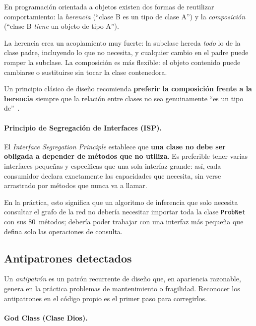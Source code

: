 \documentclass[11pt,a4paper]{article}
\newcommand{\code}[1]{\texttt{#1}}
\begin{document}
En programación orientada a objetos existen dos formas de reutilizar
comportamiento: la \emph{herencia} (``clase B es un tipo de clase A'')
y la \emph{composición} (``clase B \emph{tiene} un objeto de tipo A'').

La herencia crea un acoplamiento muy fuerte: la subclase hereda
\emph{todo} lo de la clase padre, incluyendo lo que no necesita, y
cualquier cambio en el padre puede romper la subclase.  La composición
es más flexible: el objeto contenido puede cambiarse o sustituirse sin
tocar la clase contenedora.

Un principio clásico de diseño recomienda \textbf{preferir la composición
frente a la herencia} siempre que la relación entre clases no sea
genuinamente ``es un tipo de''~\cite{gamma1995}.

\label{sec:fund-isp}
\paragraph{Principio de Segregación de Interfaces (ISP).}

El \emph{Interface Segregation Principle} establece que \textbf{una
clase no debe ser obligada a depender de métodos que no utiliza}.
Es preferible tener varias interfaces pequeñas y específicas que una
sola interfaz grande: así, cada consumidor declara exactamente las
capacidades que necesita, sin verse arrastrado por métodos que nunca
va a llamar.

En la práctica, esto significa que un algoritmo de inferencia que
solo necesita consultar el grafo de la red no debería necesitar importar
toda la clase \code{ProbNet} con sus 80~métodos; debería poder trabajar
con una interfaz más pequeña que defina solo las operaciones de consulta.

\subsection{Antipatrones detectados}
\label{sec:fund-antipatrones}

Un \emph{antipatrón} es un patrón recurrente de diseño que, en
apariencia razonable, genera en la práctica problemas de mantenimiento
o fragilidad.  Reconocer los antipatrones en el código propio es el
primer paso para corregirlos.

\label{sec:fund-god-class}
\paragraph{God Class (Clase Dios).}
\end{document}
